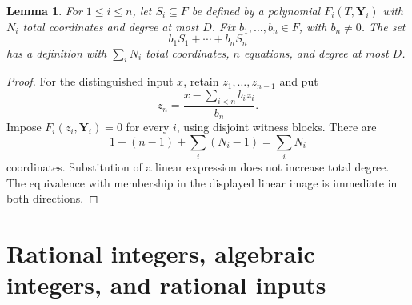 \documentclass[11pt,a4paper]{article}
\newtheorem{lemma}[theorem]{Lemma}
\theoremstyle{definition}
\begin{document}
\begin{lemma}\label{lem:linear-image}
For $1\le i\le n$, let $S_i\subseteq F$ be defined by a polynomial
$F_i(T,\mathbf Y_i)$ with $N_i$ total coordinates and degree at most
$D$. Fix $b_1,\ldots,b_n\in F$, with $b_n\ne0$. The set
\[
              b_1S_1+\cdots+b_nS_n
\]
has a definition with $\sum_iN_i$ total coordinates, $n$ equations,
and degree at most $D$.
\end{lemma}
\begin{proof}
For the distinguished input $x$, retain $z_1,\ldots,z_{n-1}$ and
put
\[
               z_n=\frac{x-\sum_{i<n}b_i z_i}{b_n}.
\]
Impose $F_i(z_i,\mathbf Y_i)=0$ for every $i$, using disjoint
witness blocks. There are
\[
          1+(n-1)+\sum_i(N_i-1)=\sum_iN_i
\]
coordinates. Substitution of a linear expression does not increase
total degree. The equivalence with membership in the displayed
linear image is immediate in both directions.
\end{proof}

\section{Rational integers, algebraic integers, and rational inputs}
\end{document}
